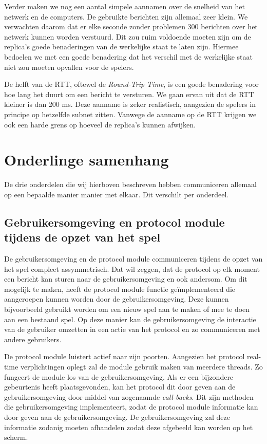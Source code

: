 \documentclass[a4paper,11pt]{article}
\begin{document}
    Verder maken we nog een aantal simpele aannamen over de snelheid van het netwerk en de computers. De gebruikte berichten zijn allemaal zeer klein. We verwachten daarom dat er elke seconde zonder problemen 300 berichten over het netwerk kunnen worden verstuurd. Dit zou ruim voldoende moeten zijn om de replica's goede benaderingen van de werkelijke staat te laten zijn. Hiermee bedoelen we met een goede benadering dat het verschil met de werkelijke staat niet zou moeten opvallen voor de spelers. 
    
    De helft van de RTT, oftewel de \emph{Round-Trip Time}, is een goede benadering voor hoe lang het duurt om een bericht te versturen. We gaan ervan uit dat de RTT kleiner is dan 200 ms. Deze aanname is zeker realistisch, aangezien de spelers in principe op hetzelfde subnet zitten. Vanwege de aanname op de RTT krijgen we ook een harde grens op hoeveel de replica's kunnen afwijken.
        
    \section{Onderlinge samenhang}
    De drie onderdelen die wij hierboven beschreven hebben communiceren allemaal op een bepaalde manier manier met elkaar. Dit verschilt per onderdeel.
    \subsection{Gebruikersomgeving en protocol module tijdens de opzet van het spel}
    De gebruikersomgeving en de protocol module communiceren tijdens de opzet van het spel compleet assymmetrisch. Dat wil zeggen, dat de protocol op elk moment een bericht kan sturen naar de gebruikersomgeving en ook andersom. Om dit mogelijk te maken, heeft de protocol module functie ge\"implementeerd die aangeroepen kunnen worden door de gebruikersomgeving. Deze kunnen bijvoorbeeld gebruikt worden om een nieuw spel aan te maken of mee te doen aan een bestaand spel. Op deze manier kan de gebruikersomgeving de interactie van de gebruiker omzetten in een actie van het protocol en zo communiceren met andere gebruikers.
    
    De protocol module luistert actief naar zijn poorten. Aangezien het protocol real-time verplichtingen oplegt zal de module gebruik maken van meerdere threads. Zo fungeert de module los van de gebruikersomgeving. Als er een bijzondere gebeurtenis heeft plaatsgevonden, kan het protocol dit door geven aan de gebruikersomgeving door middel van zogenaamde \emph{call-backs}. Dit zijn methoden die gebruikersomgeving implementeert, zodat de protocol module informatie kan door geven aan de gebruikersomgeving. De gebruikersomgeving zal deze informatie zodanig moeten afhandelen zodat deze afgebeeld kan worden op het scherm.
    
\end{document}
